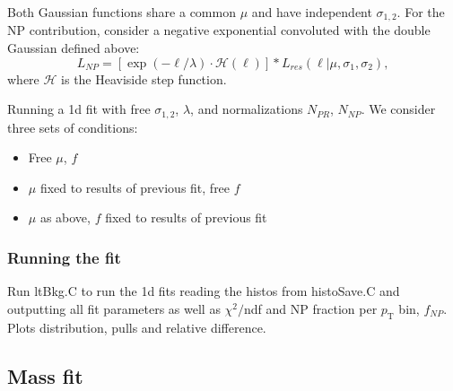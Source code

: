 \documentclass{article}
\newcommand{\pt}{p_\text{T}}
\begin{document}
Both Gaussian functions share a common $\mu$ and have independent $\sigma_{1,2}$. For the NP contribution, consider a negative exponential convoluted with the double Gaussian defined above:
\begin{equation}
L_{NP}=	\left[\exp(-\ell/\lambda)\cdot\mathcal{H}(\ell)\right]*L_{res}(\ell|\mu, \sigma_1,\sigma_2),
\end{equation}
where $\mathcal{H}$ is the Heaviside step function.

Running a 1d fit with free $\sigma_{1,2}$, $\lambda$, and normalizations $N_{PR}$, $N_{NP}$. We consider three sets of conditions:
\begin{itemize}
\item Free $\mu$, $f$
\item $\mu$ fixed to results of previous fit, free $f$
\item $\mu$ as above, $f$ fixed to results of previous fit
\end{itemize} 

\subsubsection{Running the fit}

Run ltBkg.C to run the 1d fits reading the histos from histoSave.C and outputting all fit parameters as well as $\chi^2/$ndf and NP fraction per $\pt$ bin, $f_{NP}$. Plots distribution, pulls and relative difference.

\pagebreak

\subsection{Mass fit}
\end{document}
